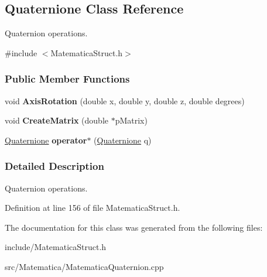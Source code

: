 \hypertarget{classQuaternione}{}\subsection{Quaternione Class Reference}
\label{classQuaternione}


Quaternion operations.  




{\ttfamily \#include $<$Matematica\+Struct.\+h$>$}

\subsubsection*{Public Member Functions}
\begin{DoxyCompactItemize}
\item 
void {\bfseries Axis\+Rotation} (double x, double y, double z, double degrees)\hypertarget{classQuaternione_a3043a01aeeb6b09cd468596764985612}{}\label{classQuaternione_a3043a01aeeb6b09cd468596764985612}

\item 
void {\bfseries Create\+Matrix} (double $\ast$p\+Matrix)\hypertarget{classQuaternione_ab75ed463292c44f80327654feef432dd}{}\label{classQuaternione_ab75ed463292c44f80327654feef432dd}

\item 
\hyperlink{classQuaternione}{Quaternione} {\bfseries operator$\ast$} (\hyperlink{classQuaternione}{Quaternione} q)\hypertarget{classQuaternione_ab73205322f5dc9e132f593f21249248f}{}\label{classQuaternione_ab73205322f5dc9e132f593f21249248f}

\end{DoxyCompactItemize}


\subsubsection{Detailed Description}
Quaternion operations. 

Definition at line 156 of file Matematica\+Struct.\+h.



The documentation for this class was generated from the following files\+:\begin{DoxyCompactItemize}
\item 
include/Matematica\+Struct.\+h\item 
src/\+Matematica/Matematica\+Quaternion.\+cpp\end{DoxyCompactItemize}
